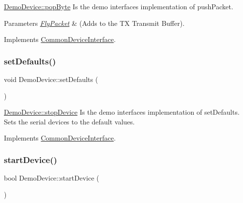 \hyperlink{class_demo_device_a788dd7e426fab9c8d19ea9fd106260d4}{Demo\+Device\+::pop\+Byte} Is the demo interface\textquotesingle{}s implementation of push\+Packet. 


\begin{DoxyParams}{Parameters}
{\em \hyperlink{class_fly_packet}{Fly\+Packet}} & (Adds to the TX Transmit Buffer). \\
\hline
\end{DoxyParams}


Implements \hyperlink{class_common_device_interface_a682446d40e63ab7e6aa95dae7e0cd83b}{Common\+Device\+Interface}.

\hypertarget{class_demo_device_a79a9c22e60aca99c7667990bedc461c8}{}\label{class_demo_device_a79a9c22e60aca99c7667990bedc461c8} 
\subsubsection{\texorpdfstring{set\+Defaults()}{setDefaults()}}
{\footnotesize\ttfamily void Demo\+Device\+::set\+Defaults (\begin{DoxyParamCaption}{ }\end{DoxyParamCaption})\hspace{0.3cm}{\ttfamily [virtual]}}



\hyperlink{class_demo_device_ab95434f7121f00789108f29a8457ec98}{Demo\+Device\+::stop\+Device} Is the demo interface\textquotesingle{}s implementation of set\+Defaults. Sets the serial devices to the default values. 



Implements \hyperlink{class_common_device_interface_a542621a8b9e023531cae26447b2f8447}{Common\+Device\+Interface}.

\hypertarget{class_demo_device_af350ecf6ff289983cff9053197f1b1f2}{}\label{class_demo_device_af350ecf6ff289983cff9053197f1b1f2} 
\subsubsection{\texorpdfstring{start\+Device()}{startDevice()}}
{\footnotesize\ttfamily bool Demo\+Device\+::start\+Device (\begin{DoxyParamCaption}{ }\end{DoxyParamCaption})\hspace{0.3cm}{\ttfamily [virtual]}}



